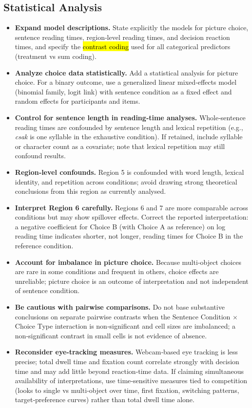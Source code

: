\documentclass[a4paper, ruler]{CUP-JNL-LIN}%
\begin{document}
\subsection{Statistical Analysis}

\begin{itemize}
  \item \textbf{Expand model descriptions.} State explicitly the models for picture choice, sentence reading times, region‑level reading times, and decision reaction times, and specify the \hl{contrast coding} used for all categorical predictors (treatment vs sum coding).
  \item \textbf{\bigstar Analyze choice data statistically.} Add a statistical analysis for picture choice. For a binary outcome, use a generalized linear mixed‑effects model (binomial family, logit link) with sentence condition as a fixed effect and random effects for participants and items.
  \item \textbf{Control for sentence length in reading‑time analyses.} Whole‑sentence reading times are confounded by sentence length and lexical repetition (e.g., \emph{csak} is one syllable in the exhaustive condition). If retained, include syllable or character count as a covariate; note that lexical repetition may still confound results.
  \item \textbf{Region‑level confounds.} Region 5 is confounded with word length, lexical identity, and repetition across conditions; avoid drawing strong theoretical conclusions from this region as currently analysed.
  \item \textbf{Interpret Region 6 carefully.} Regions 6 and 7 are more comparable across conditions but may show spillover effects. Correct the reported interpretation: a negative coefficient for Choice B (with Choice A as reference) on log reading time indicates shorter, not longer, reading times for Choice B in the reference condition.
  \item \textbf{Account for imbalance in picture choice.} Because multi‑object choices are rare in some conditions and frequent in others, choice effects are unreliable; picture choice is an outcome of interpretation and not independent of sentence condition.
  \item \textbf{Be cautious with pairwise comparisons.} Do not base substantive conclusions on separate pairwise contrasts when the Sentence Condition $\times$ Choice Type interaction is non‑significant and cell sizes are imbalanced; a non‑significant contrast in small cells is not evidence of absence.
  \item \textbf{Reconsider eye‑tracking measures.} Webcam‑based eye tracking is less precise; total dwell time and fixation count correlate strongly with decision time and may add little beyond reaction‑time data. If claiming simultaneous availability of interpretations, use time‑sensitive measures tied to competition (looks to single vs multi‑object over time, first fixation, switching patterns, target‑preference curves) rather than total dwell time alone.
\end{itemize}
\end{document}
